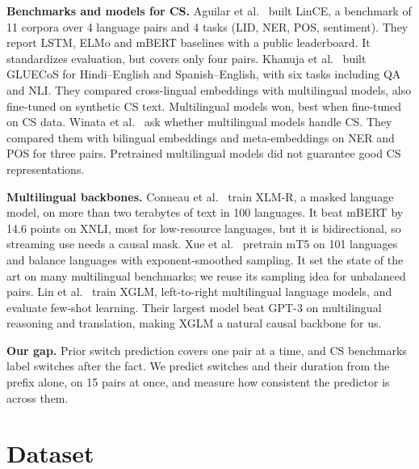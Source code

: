 \documentclass[sigconf,nonacm]{acmart}
\begin{document}
\textbf{Benchmarks and models for CS.} Aguilar et al.~\cite{aguilar2020lince} built LinCE, a benchmark of 11
corpora over 4 language pairs and 4 tasks (LID, NER, POS, sentiment). They report LSTM, ELMo and mBERT
baselines with a public leaderboard. It standardizes evaluation, but covers only four pairs. Khanuja et
al.~\cite{khanuja2020gluecos} built GLUECoS for Hindi--English and Spanish--English, with six tasks including
QA and NLI. They compared cross-lingual embeddings with multilingual models, also fine-tuned on synthetic CS
text. Multilingual models won, best when fine-tuned on CS data. Winata et al.~\cite{winata2021multilingual}
ask whether multilingual models handle CS. They compared them with bilingual embeddings and meta-embeddings on
NER and POS for three pairs. Pretrained multilingual models did not guarantee good CS representations.

\textbf{Multilingual backbones.} Conneau et al.~\cite{conneau2020xlmr} train XLM-R, a masked language model,
on more than two terabytes of text in 100 languages. It beat mBERT by 14.6 points on XNLI, most for low-resource languages,
but it is bidirectional, so streaming use needs a causal mask. Xue et al.~\cite{xue2021mt5} pretrain mT5 on 101
languages and balance languages with exponent-smoothed sampling. It set the state of the art on many
multilingual benchmarks; we reuse its sampling idea for unbalanced pairs. Lin et al.~\cite{lin2022xglm} train
XGLM, left-to-right multilingual language models, and evaluate few-shot learning. Their largest model beat
GPT-3 on multilingual reasoning and translation, making XGLM a natural causal backbone for us.

\textbf{Our gap.} Prior switch prediction covers one pair at a time, and CS benchmarks label switches after
the fact. We predict switches and their duration from the prefix alone, on 15 pairs at once, and measure how
consistent the predictor is across them.

\section{Dataset}
\end{document}
